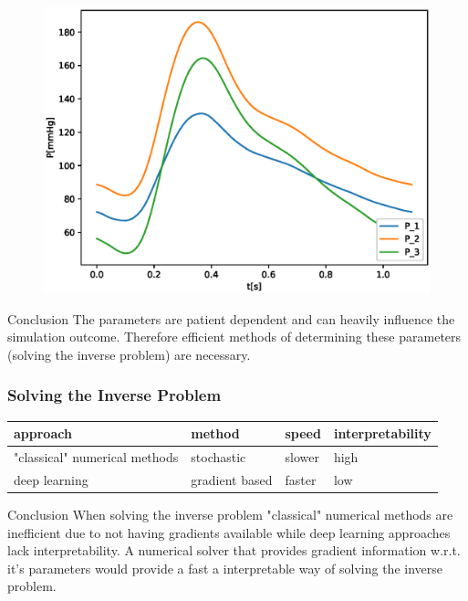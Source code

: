 \documentclass{beamer}
\begin{document}
\begin{frame}
\begin{figure}
\begin{center}
\begin{minipage}{0.43\linewidth}
				\includegraphics[width=\linewidth]{images/compare_output_params_P_P.eps}
			\end{minipage}
		\end{center}
	\end{figure}
	\begin{block}{Conclusion}
		The parameters are patient dependent and can heavily influence the simulation outcome. Therefore efficient methods of determining these parameters (solving the inverse problem) are necessary.
	\end{block}
\end{frame}

\begin{frame}
	\frametitle{Solving the Inverse Problem}
\begin{tabular}{| m{2cm} | m{2cm}| m{2cm} | m{2.4cm} | } 
	\hline
	approach & method & speed & interpretability\\ 
	\hline
	\hline
	"classical" numerical methods & stochastic & slower & high \\ 
	\hline
	deep learning & gradient based & faster & low \\ 
	\hline
\end{tabular}

	\begin{block}{Conclusion}
		When solving the inverse problem "classical" numerical methods are inefficient due to not having gradients available while deep learning approaches lack interpretability.
		A numerical solver that provides gradient information w.r.t. it's parameters would provide a fast a interpretable way of solving the inverse problem.
	\end{block}

\end{frame}
\end{document}
